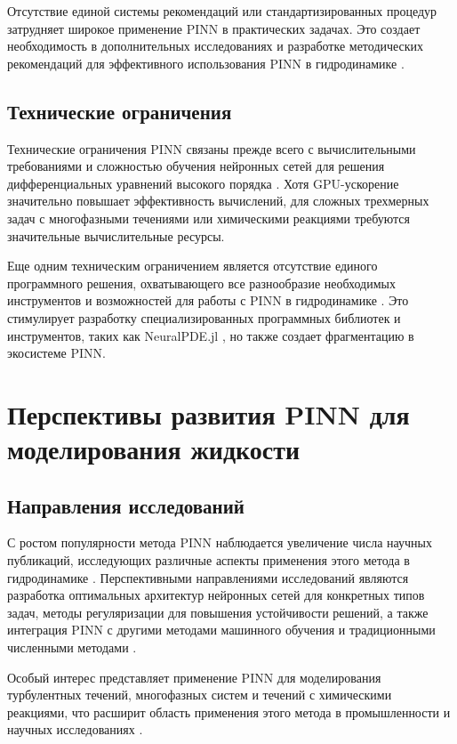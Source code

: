 Отсутствие единой системы рекомендаций или стандартизированных процедур затрудняет широкое применение PINN в практических
задачах. Это создает необходимость в дополнительных исследованиях и разработке методических рекомендаций для эффективного
использования PINN в гидродинамике \cite{wang2022respecting}.

\subsection{Технические ограничения}
Технические ограничения PINN связаны прежде всего с вычислительными требованиями и сложностью обучения нейронных сетей для
решения дифференциальных уравнений высокого порядка \cite{wang2021understanding}. Хотя GPU-ускорение значительно повышает
эффективность вычислений, для сложных трехмерных задач с многофазными течениями или химическими реакциями требуются
значительные вычислительные ресурсы.

Еще одним техническим ограничением является отсутствие единого программного решения, охватывающего все разнообразие
необходимых инструментов и возможностей для работы с PINN в гидродинамике \cite{cuomo2022scientific}. Это стимулирует
разработку специализированных программных библиотек и инструментов, таких как NeuralPDE.jl \cite{neuralpde2023}, но также
создает фрагментацию в экосистеме PINN.

\section{Перспективы развития PINN для моделирования жидкости}
\subsection{Направления исследований}
С ростом популярности метода PINN наблюдается увеличение числа научных публикаций, исследующих различные аспекты применения
этого метода в гидродинамике \cite{karniadakis2021physics}. Перспективными направлениями исследований являются разработка
оптимальных архитектур нейронных сетей для конкретных типов задач, методы регуляризации для повышения устойчивости решений,
а также интеграция PINN с другими методами машинного обучения и традиционными численными методами \cite{jagtap2022physics}.

Особый интерес представляет применение PINN для моделирования турбулентных течений, многофазных систем и течений с химическими
реакциями, что расширит область применения этого метода в промышленности и научных исследованиях \cite{sun2020surrogate}.


